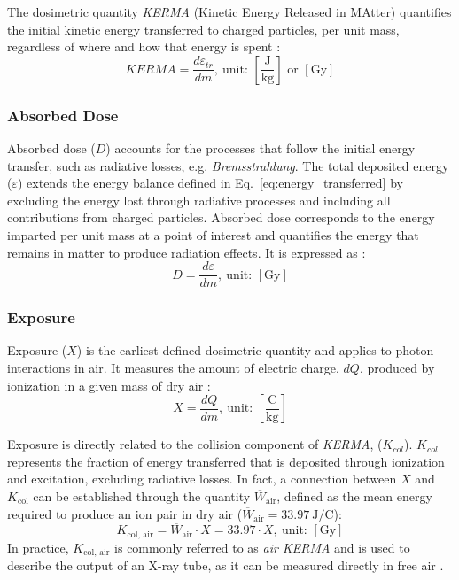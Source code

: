 The dosimetric quantity \emph{KERMA} (Kinetic Energy Released in MAtter) quantifies the initial kinetic energy transferred to char\-ged particles, per unit mass, regardless of where and how that energy is spent \cite{6,12}:
\begin{equation}
KERMA = \frac{d\varepsilon_{tr}}{dm},\ \text{unit: } \left[\frac{\mathrm{J}}{\mathrm{kg}}\right] \text{ or } [\mathrm{Gy}]
\label{eq:kerma}
\end{equation}

\subsubsection{Absorbed Dose}
Absorbed dose ($D$) accounts for the processes that follow the initial energy transfer, such as radiative losses, e.g. \emph{Bremsstrahlung}. The total deposited energy (\( \varepsilon \)) extends the energy balance defined in Eq.~\ref{eq:energy_transferred} by excluding the energy lost through radiative processes and including all contributions from charged particles. Absorbed dose corresponds to the energy imparted per unit mass at a point of interest and quantifies the energy that remains in matter to produce radiation effects. It is expressed as \cite{11,12}:
\begin{equation}
D = \frac{d\varepsilon}{dm},\ \text{unit: } [\mathrm{Gy}]
\label{eq:absorbed_dose}
\end{equation}

\subsubsection{Exposure}
Exposure ($X$) is the earliest defined dosimetric quantity and applies to photon interactions in air. It measures the amount of electric charge, \(dQ\), produced by ionization in a given mass of dry air \cite{12}:
\begin{equation}
X = \frac{dQ}{dm},\ \text{unit: } \left[\frac{\mathrm{C}}{\mathrm{kg}}\right]
\label{eq:exposure}
\end{equation}

Exposure is directly related to the collision component of \emph{KERMA}, (\(K_{col}\)). \(K_{col}\) represents the fraction of energy transferred that is deposited through ionization and excitation, excluding radiative losses. In fact, a connection between $X$ and \(K_{\text{col}}\) can be established through the quantity \(\overline{W}_{\text{air}}\), defined as the mean energy required to produce an ion pair in dry air (\(\overline{W}_{\text{air}} = 33.97~\mathrm{J/C}\)):
\begin{equation}
K_{\text{col, air}} = \overline{W}_{\text{air}} \cdot X = 33.97 \cdot X,\ \text{unit: } [\mathrm{Gy}]
\label{eq:kcair_exposure}
\end{equation}
\noindent
In practice, \(K_{\text{col, air}}\) is commonly referred to as \emph{air KERMA} and is used to describe the output of an X-ray tube, as it can be measured directly in free air \cite{11}.

